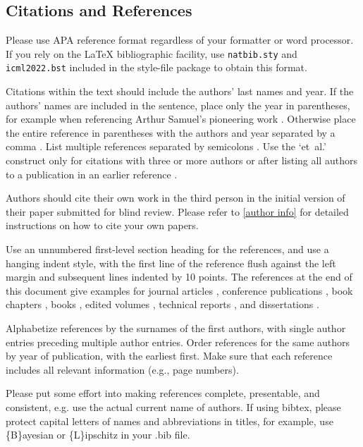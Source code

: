 \documentclass[nohyperref]{article}
\theoremstyle{plain}
\theoremstyle{definition}
\theoremstyle{remark}
\begin{document}
\subsection{Citations and References}

Please use APA reference format regardless of your formatter
or word processor. If you rely on the \LaTeX\/ bibliographic
facility, use \texttt{natbib.sty} and \texttt{icml2022.bst}
included in the style-file package to obtain this format.

Citations within the text should include the authors' last names and
year. If the authors' names are included in the sentence, place only
the year in parentheses, for example when referencing Arthur Samuel's
pioneering work . Otherwise place the entire
reference in parentheses with the authors and year separated by a
comma \cite{Samuel59}. List multiple references separated by
semicolons \cite{kearns89,Samuel59,mitchell80}. Use the `et~al.'
construct only for citations with three or more authors or after
listing all authors to a publication in an earlier reference \cite{MachineLearningI}.

Authors should cite their own work in the third person
in the initial version of their paper submitted for blind review.
Please refer to \cref{author info} for detailed instructions on how to
cite your own papers.

Use an unnumbered first-level section heading for the references, and use a
hanging indent style, with the first line of the reference flush against the
left margin and subsequent lines indented by 10 points. The references at the
end of this document give examples for journal articles \cite{Samuel59},
conference publications \cite{langley00}, book chapters \cite{Newell81}, books
\cite{DudaHart2nd}, edited volumes \cite{MachineLearningI}, technical reports
\cite{mitchell80}, and dissertations \cite{kearns89}.

Alphabetize references by the surnames of the first authors, with
single author entries preceding multiple author entries. Order
references for the same authors by year of publication, with the
earliest first. Make sure that each reference includes all relevant
information (e.g., page numbers).

Please put some effort into making references complete, presentable, and
consistent, e.g. use the actual current name of authors.
If using bibtex, please protect capital letters of names and
abbreviations in titles, for example, use \{B\}ayesian or \{L\}ipschitz
in your .bib file.
\end{document}
